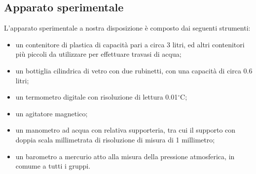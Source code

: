 \subsection{Apparato sperimentale}

L'apparato sperimentale a nostra disposizione è composto dai seguenti strumenti:

\begin{itemize}
	\item{un contenitore di plastica di capacità pari a circa 3 litri, ed altri contenitori più piccoli da utilizzare per effettuare travasi di acqua;}
	\item{un bottiglia cilindrica di vetro con due rubinetti, con una capacità di circa 0.6 litri;}
	\item{un termometro digitale con risoluzione di lettura 0.01$^\circ$C;}
	\item{un agitatore magnetico;}
	\item{un manometro ad acqua con relativa supporteria, tra cui il supporto con doppia scala millimetrata di risoluzione di misura di 1 millimetro;}
	\item{un barometro a mercurio atto alla misura della pressione atmosferica, in comume a tutti i gruppi.}
\end{itemize}
